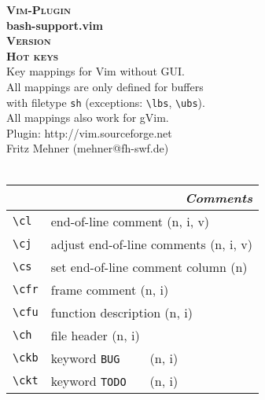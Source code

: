 \documentclass[oneside,12pt,a4paper,DIV18]{scrartcl}
\begin{document}
\begin{center}
\textbf{\textsc{\small{Vim-Plugin}}}\\
\textbf{\large{bash-support.vim}}\\
\textbf{\textsc{\small{Version \PluginVersion}}}\\
\vspace{5mm}%
\textbf{\textsc{\huge{Hot keys}}}\\ 
\vspace{5mm}%
\footnotesize{Key mappings for Vim without GUI.}\\
\vspace{1mm}%
\footnotesize{
All mappings are only defined for buffers\\
with filetype \texttt{sh} (exceptions: \verb'\lbs',  \verb'\ubs').\\
All mappings also work for gVim.}\\ 
\vspace{1mm}%
\footnotesize{Plugin: http://vim.sourceforge.net}\\
\footnotesize{Fritz Mehner (mehner@fh-swf.de)}\\
\footnotesize{\ReleaseDate}\\
\vspace{3.5mm}
\small
\begin{tabular}[]{|p{11mm}|p{59mm}|}
\hline
\multicolumn{2}{|r|}{\textsl{\textbf{C}omments}} \\
\hline \verb'\cl'  & end-of-line comment              \hfill (n, i, v) \\
\hline \verb'\cj'  & adjust end-of-line comments      \hfill (n, i, v) \\
\hline \verb'\cs'  & set end-of-line comment column   \hfill (n) \\
\hline \verb'\cfr' & frame comment                    \hfill (n, i) \\
\hline \verb'\cfu' & function description             \hfill (n, i) \\
\hline \verb'\ch'  & file header                      \hfill (n, i) \\
\hline \verb'\ckb' & keyword \verb'BUG    '           \hfill (n, i) \\
\hline \verb'\ckt' & keyword \verb'TODO   '           \hfill (n, i) \\

\end{tabular}
\end{center}
\end{document}
